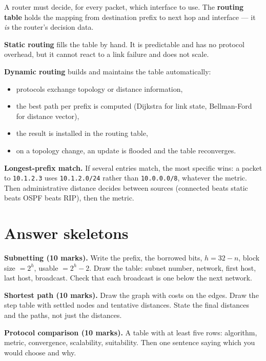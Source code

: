\documentclass[11pt,a4paper]{article}
\begin{document}
\begin{solbox}
A router must decide, for every packet, which interface to use. The \textbf{routing table} holds the mapping from destination prefix to next hop and interface --- it \emph{is} the router's decision data.

\textbf{Static routing} fills the table by hand. It is predictable and has no protocol overhead, but it cannot react to a link failure and does not scale.

\textbf{Dynamic routing} builds and maintains the table automatically:
\begin{itemize}
\item protocols exchange topology or distance information,
\item the best path per prefix is computed (Dijkstra for link state, Bellman-Ford for distance vector),
\item the result is installed in the routing table,
\item on a topology change, an update is flooded and the table reconverges.
\end{itemize}

\textbf{Longest-prefix match.} If several entries match, the most specific wins: a packet to \texttt{10.1.2.3} uses \texttt{10.1.2.0/24} rather than \texttt{10.0.0.0/8}, whatever the metric. Then administrative distance decides between sources (connected beats static beats OSPF beats RIP), then the metric.
\end{solbox}

\section{Answer skeletons}

\begin{answerbox}
\textbf{Subnetting (10 marks).} Write the prefix, the borrowed bits, $h = 32 - n$, block size $= 2^h$, usable $= 2^h - 2$. Draw the table: subnet number, network, first host, last host, broadcast. Check that each broadcast is one below the next network.
\end{answerbox}

\begin{answerbox}
\textbf{Shortest path (10 marks).} Draw the graph with costs on the edges. Draw the step table with settled nodes and tentative distances. State the final distances and the paths, not just the distances.
\end{answerbox}

\begin{answerbox}
\textbf{Protocol comparison (10 marks).} A table with at least five rows: algorithm, metric, convergence, scalability, suitability. Then one sentence saying which you would choose and why.
\end{answerbox}
\end{document}
